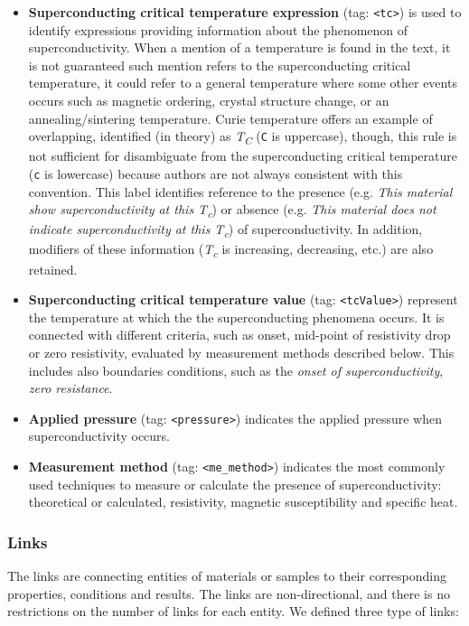 \documentclass[fleqn,10pt]{wlscirep}
\begin{document}
\begin{itemize}
\item \textbf{Superconducting critical temperature expression} (tag: \texttt{<tc>}) is used to identify expressions providing information about the phenomenon of superconductivity. When a mention of a temperature is found in the text, it is not guaranteed such mention refers to the superconducting critical temperature, it could refer to a general temperature where some other events occurs such as magnetic ordering, crystal structure change, or an annealing/sintering temperature.
Curie temperature offers an example of overlapping, identified (in theory) as \textit{T\textsubscript{C}} (\texttt{C} is uppercase), though, this rule is not sufficient for disambiguate from the superconducting critical temperature (\texttt{c} is lowercase) because authors are not always consistent with this convention.
This label identifies reference to the presence (e.g. \textit{This material show superconductivity at this T\textsubscript{c}}) or absence (e.g. \textit{This material does not indicate superconductivity at this T\textsubscript{c}}) of superconductivity.
In addition, modifiers of these information (\textit{T\textsubscript{c}} is increasing, decreasing, etc.) are also retained. 

\item \textbf{Superconducting critical temperature value} (tag: \texttt{<tcValue>}) represent the temperature at which the the superconducting phenomena occurs. 
It is connected with different criteria, such as onset, mid-point of resistivity drop or zero resistivity, evaluated by measurement methods described below.
This includes also boundaries conditions, such as the \textit{onset of superconductivity}, \textit{zero resistance}. 

\item \textbf{Applied pressure} (tag: \texttt{<pressure>}) indicates the applied pressure when superconductivity occurs. 

\item \textbf{Measurement method} (tag: \texttt{<me\_method>}) indicates the most commonly used techniques to measure or calculate the presence of superconductivity: theoretical or calculated, resistivity, magnetic susceptibility and specific heat. 
\end{itemize}
\FloatBarrier
\subsubsection*{Links}

The links are connecting entities of materials or samples to their corresponding properties, conditions and results. 
The links are non-directional, and there is no restrictions on the number of links for each entity. 
We defined three type of links:
\end{document}
